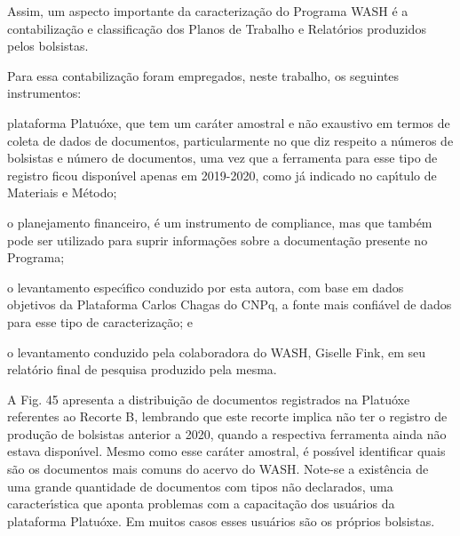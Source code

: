 \documentclass[
12pt,		%
openright,	%
twoside,  %
a4paper,			%
chapter=TITLE,		%
english,			%
french,				%
spanish,			%
brazil				%
]{USPSC-classe/USPSC}
\begin{document}
Assim, um aspecto importante da caracteriza\c{c}\~ao do Programa WASH \'e a contabiliza\c{c}\~ao e classifica\c{c}\~ao dos Planos de Trabalho e Relat\'orios produzidos pelos bolsistas.









Para essa contabiliza\c{c}\~ao foram empregados, neste trabalho, os seguintes instrumentos:










\begin{alineas}
\item plataforma Platu\'oxe, que tem um car\'ater amostral e n\~ao exaustivo em termos de coleta de dados de documentos, particularmente no que diz respeito a n\'umeros de bolsistas e n\'umero de documentos, uma vez que a ferramenta para esse tipo de registro ficou dispon\'{\i}vel apenas em 2019-2020, como j\'a indicado no cap\'{\i}tulo de Materiais e M\'etodo;
\item o planejamento financeiro, \'e um instrumento de compliance, mas que tamb\'em pode ser utilizado para suprir informa\c{c}\~oes sobre a documenta\c{c}\~ao presente no Programa;
\item o levantamento espec\'{\i}fico conduzido por esta autora, com base em dados objetivos da Plataforma Carlos Chagas do CNPq, a fonte mais confi\'avel de dados para esse tipo de caracteriza\c{c}\~ao; e
\item o levantamento conduzido pela colaboradora do WASH, Giselle Fink, em seu relat\'orio final de pesquisa produzido pela mesma.
\end{alineas}

A Fig. 45 apresenta a distribui\c{c}\~ao de documentos registrados na Platu\'oxe referentes ao Recorte B, lembrando que este recorte implica n\~ao ter o registro de produ\c{c}\~ao de bolsistas anterior a 2020, quando a respectiva ferramenta ainda n\~ao estava dispon\'{\i}vel. Mesmo como esse car\'ater amostral, \'e poss\'{\i}vel identificar quais s\~ao os documentos mais comuns do acervo do WASH. Note-se a exist\^encia de uma grande quantidade de documentos com tipos n\~ao declarados, uma caracter\'{\i}stica que aponta problemas com a capacita\c{c}\~ao dos usu\'arios da plataforma Platu\'oxe. Em muitos casos esses usu\'arios s\~ao os pr\'oprios bolsistas.
\end{document}
